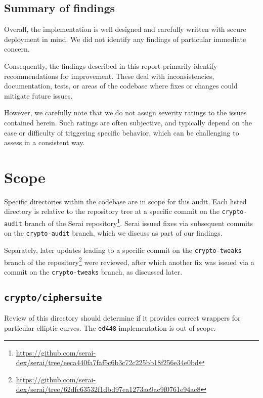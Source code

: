 \documentclass{article}
\begin{document}
\subsection{Summary of findings}

Overall, the implementation is well designed and carefully written with secure deployment in mind.
We did not identify any findings of particular immediate concern.

Consequently, the findings described in this report primarily identify recommendations for improvement.
These deal with inconsistencies, documentation, tests, or areas of the codebase where fixes or changes could mitigate future issues.

However, we carefully note that we do not assign severity ratings to the issues contained herein.
Such ratings are often subjective, and typically depend on the ease or difficulty of triggering specific behavior, which can be challenging to assess in a consistent way.


\section{Scope}

Specific directories within the codebase are in scope for this audit.
Each listed directory is relative to the repository tree at a specific commit on the \texttt{crypto-audit} branch of the Serai repository\footnote{\url{https://github.com/serai-dex/serai/tree/eeca440fa7faf5c6b3c72c225bb18f256e34e0bd}}.
Serai issued fixes via subsequent commits on the \texttt{crypto-audit} branch, which we discuss as part of our findings.

Separately, later updates leading to a specific commit on the \texttt{crypto-tweaks} branch of the repository\footnote{\url{https://github.com/serai-dex/serai/tree/62dfc63532f1dbd97ea1273ae9ac9f0761e94ac8}} were reviewed, after which another fix was issued via a commit on the \texttt{crypto-tweaks} branch, as discussed later.


\subsection{\texttt{crypto/ciphersuite}}

Review of this directory should determine if it provides correct wrappers for particular elliptic curves.
The \texttt{ed448} implementation is out of scope.
\end{document}
